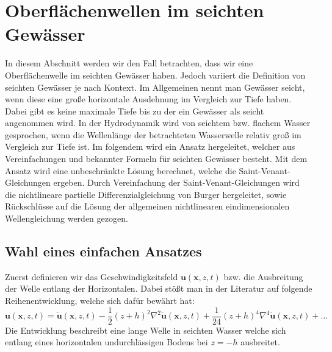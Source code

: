 %
%
%
%
\section{Oberflächenwellen im seichten Gewässer
\label{luke:section:SeichtenGewaesser}}

In diesem Abschnitt werden wir den Fall betrachten, dass wir eine Oberflächenwelle im seichten Gewässer haben. 
Jedoch variiert die Definition von seichten Gewässer je nach Kontext. 
Im Allgemeinen nennt man Gewässer seicht, wenn diese eine große horizontale Ausdehnung im Vergleich zur Tiefe haben. 
Dabei gibt es keine maximale Tiefe bis zu der ein Gewässer als seicht angenommen wird.
In der Hydrodynamik wird von seichtem bzw. flachem Wasser gesprochen, wenn die Wellenlänge der betrachteten Wasserwelle relativ groß im Vergleich zur Tiefe ist.
Im folgendem wird ein Ansatz hergeleitet, welcher aus Vereinfachungen und bekannter Formeln für seichten Gewässer besteht.
Mit dem Ansatz wird eine unbeschränkte Lösung berechnet, welche die Saint-Venant-Gleichungen ergeben.
Durch Vereinfachung der Saint-Venant-Gleichungen wird die nichtlineare partielle Differenzialgleichung von Burger hergeleitet, sowie Rückschlüsse auf die Lösung der allgemeinen nichtlinearen eindimensionalen Wellengleichung werden gezogen. 

\subsection{Wahl eines einfachen Ansatzes}
Zuerst definieren wir das Geschwindigkeitsfeld $\bm{u}(\bm{x},z,t)$ bzw. die Ausbreitung der Welle entlang der Horizontalen.
Dabei stößt man in der Literatur auf folgende Reihenentwicklung, welche sich dafür bewährt hat:
\[
\bm{u}(\bm{x},z,t) = \check{\bm{u}}(\bm{x},z,t) - \frac{1}{2} (z + h)^2 \nabla^2 \check{\bm{u}}(\bm{x},z,t) + \frac{1}{24} (z + h)^4 \nabla^4 \check{\bm{u}}(\bm{x},z,t) + \ldots
\]
Die Entwicklung beschreibt eine lange Welle in seichten Wasser welche sich entlang eines horizontalen undurchlässigen Bodens bei $z = -h$ ausbreitet.

